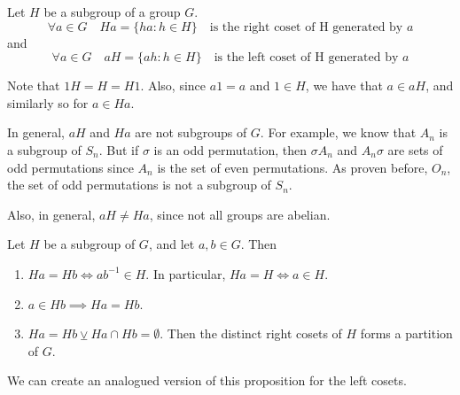 \begin{defn}[Coset]
\label{defn:coset}
  Let $H$ be a subgroup of a group $G$.
  \begin{equation*}
    \forall a \in G \quad Ha = \{ha : h \in H\} \quad \text{is the right coset of H generated by } a
  \end{equation*}
  and
  \begin{equation*}
    \forall a \in G \quad aH = \{ah : h \in H\} \quad \text{is the left coset of H generated by } a
  \end{equation*}
\end{defn}

\begin{note}
  Note that $1H = H = H1$. Also, since $a1 = a$ and $1 \in H$, we have that $a \in aH$, and similarly so for $a \in Ha$.

  In general, $aH$ and $Ha$ are not subgroups of $G$. For example, we know that $A_n$ is a subgroup of $S_n$. But if $\sigma$ is an odd permutation, then $\sigma A_n$ and $A_n \sigma$ are sets of odd permutations since $A_n$ is the set of even permutations. As proven before, $O_n$, the set of odd permutations is not a subgroup of $S_n$.

  Also, in general, $aH \neq Ha$, since not all groups are abelian.
\end{note}

\begin{propo}
\label{propo:properties_of_cosets}
  Let $H$ be a subgroup of $G$, and let $a, b \in G$. Then
  \begin{enumerate}
    \item $Ha = Hb \iff ab^{-1} \in H$. In particular, $Ha = H \iff a \in H$.
    \item $a \in Hb \implies Ha = Hb$.
    \item $Ha = Hb \veebar Ha \cap Hb = \emptyset$. Then the distinct right cosets of $H$ forms a partition of $G$.
  \end{enumerate}
  We can create an analogued version of this proposition for the left cosets.
\end{propo}

